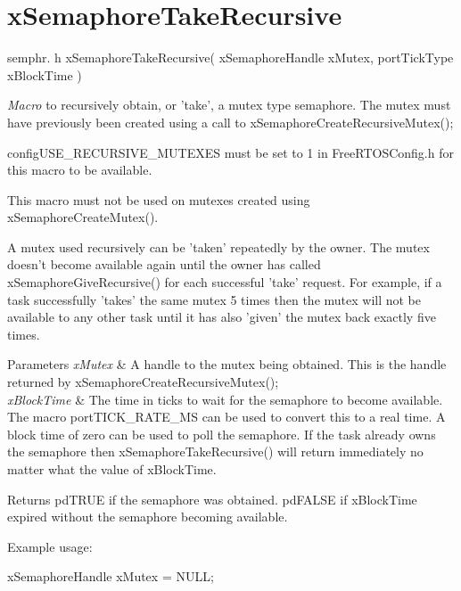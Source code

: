 \hypertarget{group__x_semaphore_take_recursive}{\section{x\-Semaphore\-Take\-Recursive}
\label{group__x_semaphore_take_recursive}
}
semphr. h x\-Semaphore\-Take\-Recursive( x\-Semaphore\-Handle x\-Mutex, port\-Tick\-Type x\-Block\-Time )

{\itshape Macro} to recursively obtain, or 'take', a mutex type semaphore. The mutex must have previously been created using a call to x\-Semaphore\-Create\-Recursive\-Mutex();

config\-U\-S\-E\-\_\-\-R\-E\-C\-U\-R\-S\-I\-V\-E\-\_\-\-M\-U\-T\-E\-X\-E\-S must be set to 1 in Free\-R\-T\-O\-S\-Config.\-h for this macro to be available.

This macro must not be used on mutexes created using x\-Semaphore\-Create\-Mutex().

A mutex used recursively can be 'taken' repeatedly by the owner. The mutex doesn't become available again until the owner has called x\-Semaphore\-Give\-Recursive() for each successful 'take' request. For example, if a task successfully 'takes' the same mutex 5 times then the mutex will not be available to any other task until it has also 'given' the mutex back exactly five times.


\begin{DoxyParams}{Parameters}
{\em x\-Mutex} & A handle to the mutex being obtained. This is the handle returned by x\-Semaphore\-Create\-Recursive\-Mutex();\\
\hline
{\em x\-Block\-Time} & The time in ticks to wait for the semaphore to become available. The macro port\-T\-I\-C\-K\-\_\-\-R\-A\-T\-E\-\_\-\-M\-S can be used to convert this to a real time. A block time of zero can be used to poll the semaphore. If the task already owns the semaphore then x\-Semaphore\-Take\-Recursive() will return immediately no matter what the value of x\-Block\-Time.\\
\hline
\end{DoxyParams}
\begin{DoxyReturn}{Returns}
pd\-T\-R\-U\-E if the semaphore was obtained. pd\-F\-A\-L\-S\-E if x\-Block\-Time expired without the semaphore becoming available.
\end{DoxyReturn}
Example usage\-: 
\begin{DoxyPre}
 xSemaphoreHandle xMutex = NULL;\end{DoxyPre}




